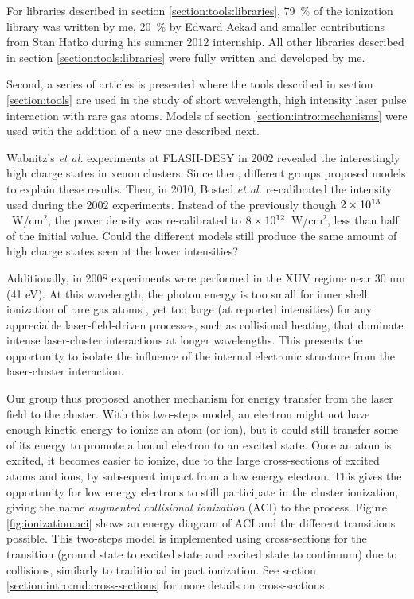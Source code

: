 For libraries described in section \ref{section:tools:libraries}, 79~\% of the
ionization library was written by me, 20~\% by Edward Ackad and smaller
contributions from Stan Hatko during his summer 2012 internship. All other
libraries described in section \ref{section:tools:libraries} were fully
written and developed by me.


Second, a series of articles is presented where the tools described in section
\ref{section:tools} are used in the study of short wavelength, high intensity
laser pulse interaction with rare gas atoms. Models of section
\ref{section:intro:mechanisms} were used with the addition of a new one
described next.

Wabnitz's \textit{et al.} experiments at FLASH-DESY in 2002 revealed the
interestingly high charge states in xenon clusters. Since then, different groups
proposed models to explain these results. Then, in 2010, Bosted \textit{et al.}
re-calibrated the intensity used during the 2002 experiments.
Instead of the previously though $\ten{2}{13}$~W/cm$^2$, the power density was
re-calibrated to $\ten{8}{12}$~W/cm$^2$, less than half of the initial value.
Could the different models still produce the same amount of high charge states
seen at the lower intensities?

Additionally, in 2008 experiments \cite{Bostedt2008,Murphy2008b} were performed
in the XUV regime near 30 nm (41 eV). At this wavelength, the photon energy is
too small for inner shell ionization of rare gas atoms , yet too large
(at reported intensities) for any appreciable laser-field-driven processes, such
as collisional heating, that dominate intense laser-cluster interactions at
longer wavelengths. This presents the opportunity to isolate the influence of
the internal electronic structure from the laser-cluster interaction.

Our group thus proposed another mechanism for energy transfer from the laser field
to the cluster. With this two-steps model, an electron might not have enough
kinetic energy to ionize an atom (or ion), but it could still transfer some of
its energy to promote a bound electron to an excited state. Once an atom is
excited, it becomes easier to ionize, due to the large cross-sections of excited
atoms and ions, by subsequent impact from a low energy electron. This gives the
opportunity for low energy electrons to still participate in the cluster
ionization, giving the name \textit{augmented collisional ionization} (ACI) to
the process.
Figure \ref{fig:ionization:aci} shows an energy diagram of ACI and the
different transitions possible. This two-steps model is implemented using
cross-sections for the transition (ground state to excited state and excited
state to continuum) due to collisions, similarly to traditional impact
ionization. See section \ref{section:intro:md:cross-sections} for more
details on cross-sections.

